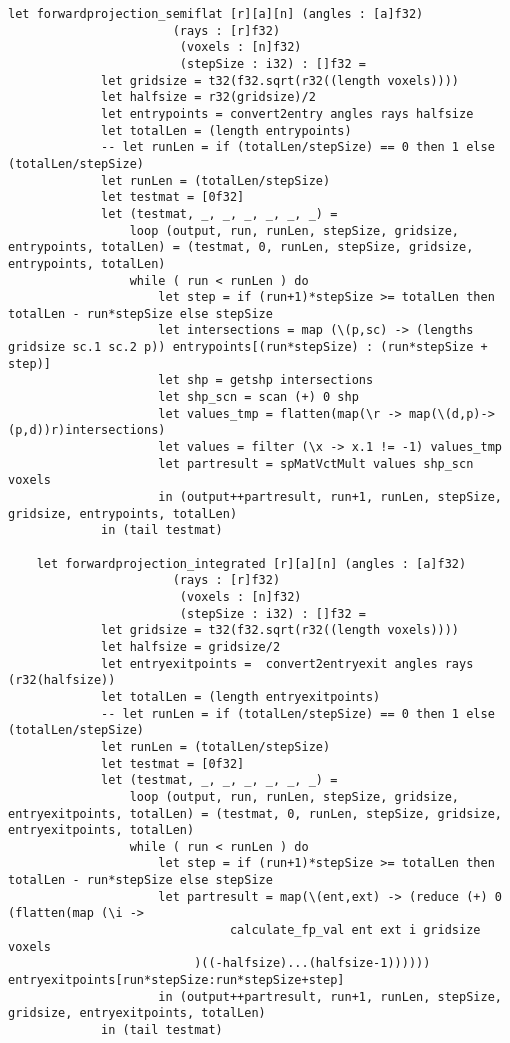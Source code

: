 \begin{lstlisting}[language=Futhark]
    let forwardprojection_semiflat [r][a][n] (angles : [a]f32)
                       (rays : [r]f32)
                        (voxels : [n]f32)
                        (stepSize : i32) : []f32 =
             let gridsize = t32(f32.sqrt(r32((length voxels))))
             let halfsize = r32(gridsize)/2
             let entrypoints = convert2entry angles rays halfsize
             let totalLen = (length entrypoints)
             -- let runLen = if (totalLen/stepSize) == 0 then 1 else (totalLen/stepSize)
             let runLen = (totalLen/stepSize)
             let testmat = [0f32]
             let (testmat, _, _, _, _, _, _) =
                 loop (output, run, runLen, stepSize, gridsize, entrypoints, totalLen) = (testmat, 0, runLen, stepSize, gridsize, entrypoints, totalLen)
                 while ( run < runLen ) do
                     let step = if (run+1)*stepSize >= totalLen then totalLen - run*stepSize else stepSize
                     let intersections = map (\(p,sc) -> (lengths gridsize sc.1 sc.2 p)) entrypoints[(run*stepSize) : (run*stepSize + step)]
                     let shp = getshp intersections
                     let shp_scn = scan (+) 0 shp
                     let values_tmp = flatten(map(\r -> map(\(d,p)->(p,d))r)intersections)
                     let values = filter (\x -> x.1 != -1) values_tmp
                     let partresult = spMatVctMult values shp_scn voxels
                     in (output++partresult, run+1, runLen, stepSize, gridsize, entrypoints, totalLen)
             in (tail testmat)

    let forwardprojection_integrated [r][a][n] (angles : [a]f32)
                       (rays : [r]f32)
                        (voxels : [n]f32)
                        (stepSize : i32) : []f32 =
             let gridsize = t32(f32.sqrt(r32((length voxels))))
             let halfsize = gridsize/2
             let entryexitpoints =  convert2entryexit angles rays (r32(halfsize))
             let totalLen = (length entryexitpoints)
             -- let runLen = if (totalLen/stepSize) == 0 then 1 else (totalLen/stepSize)
             let runLen = (totalLen/stepSize)
             let testmat = [0f32]
             let (testmat, _, _, _, _, _, _) =
                 loop (output, run, runLen, stepSize, gridsize, entryexitpoints, totalLen) = (testmat, 0, runLen, stepSize, gridsize, entryexitpoints, totalLen)
                 while ( run < runLen ) do
                     let step = if (run+1)*stepSize >= totalLen then totalLen - run*stepSize else stepSize
                     let partresult = map(\(ent,ext) -> (reduce (+) 0 (flatten(map (\i ->
                               calculate_fp_val ent ext i gridsize voxels
                          )((-halfsize)...(halfsize-1)))))) entryexitpoints[run*stepSize:run*stepSize+step]
                     in (output++partresult, run+1, runLen, stepSize, gridsize, entryexitpoints, totalLen)
             in (tail testmat)



\end{lstlisting}
